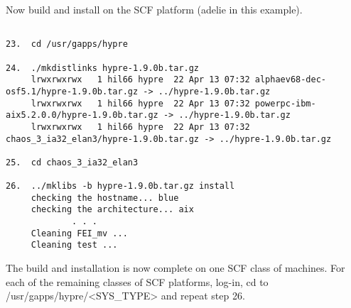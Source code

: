 Now build and install \hypre{} on the SCF platform (adelie in this example).
\begin{verbatim}

23.  cd /usr/gapps/hypre

24.  ./mkdistlinks hypre-1.9.0b.tar.gz
     lrwxrwxrwx   1 hil66 hypre  22 Apr 13 07:32 alphaev68-dec-osf5.1/hypre-1.9.0b.tar.gz -> ../hypre-1.9.0b.tar.gz
     lrwxrwxrwx   1 hil66 hypre  22 Apr 13 07:32 powerpc-ibm-aix5.2.0.0/hypre-1.9.0b.tar.gz -> ../hypre-1.9.0b.tar.gz
     lrwxrwxrwx   1 hil66 hypre  22 Apr 13 07:32 chaos_3_ia32_elan3/hypre-1.9.0b.tar.gz -> ../hypre-1.9.0b.tar.gz

25.  cd chaos_3_ia32_elan3

26.  ../mklibs -b hypre-1.9.0b.tar.gz install
     checking the hostname... blue
     checking the architecture... aix
             . . .
     Cleaning FEI_mv ...
     Cleaning test ...
\end{verbatim}
The build and installation is now complete on one SCF class of machines. For each of the 
remaining classes of SCF platforms, log-in, cd to /usr/gapps/hypre/<SYS\_TYPE> and repeat
step 26.
